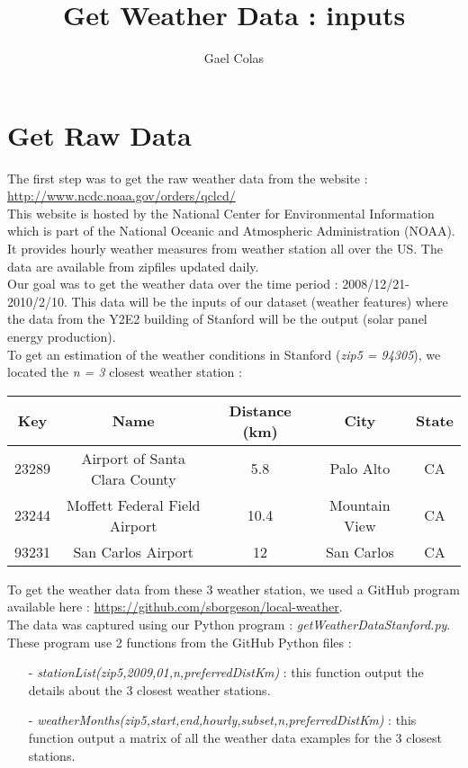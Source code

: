 \documentclass[]{report}
\title{Get Weather Data : inputs}
\author{Gael Colas}
\begin{document}
\section{Get Raw Data}

	The first step was to get the raw weather data from the website : \url{http://www.ncdc.noaa.gov/orders/qclcd/}\\
	
	This website is hosted by the National Center for Environmental Information which is part of the National Oceanic and Atmospheric Administration (NOAA). It provides hourly weather measures from weather station all over the US. The data are available from zipfiles updated daily.\\
	
	Our goal was to get the weather data over the time period : 2008/12/21-2010/2/10.
	This data will be the inputs of our dataset (weather features) where the data from the Y2E2 building of Stanford will be the output (solar panel energy production).\\
	
	To get an estimation of the weather conditions in Stanford (\emph{zip5 = 94305}), we located the \emph{n = 3} closest weather station :\\
	
	\begin{tabular}{|c|c|c|c|c|}
		\hline
		Key & Name & Distance (km) & City & State\\ \hline
		23289 & Airport of Santa Clara County & 5.8 & Palo Alto & CA\\ \hline
		23244 & Moffett Federal Field Airport & 10.4 & Mountain View & CA\\ \hline
		93231 & San Carlos Airport & 12 & San Carlos & CA\\ \hline
	\end{tabular}	
	\newline
	
	To get the weather data from these 3 weather station, we used a GitHub program available here : \url{https://github.com/sborgeson/local-weather}.\\
	
	The data was captured using our Python program : \emph{getWeatherDataStanford.py}. These program use 2 functions from the GitHub Python files :
	\begin{itemize}
		\item [-] \emph{stationList(zip5,2009,01,n,preferredDistKm)} : this function output the details about the 3 closest weather stations.
		\item [-] \emph{weatherMonths(zip5,start,end,hourly,subset,n,preferredDistKm)} : this function output a matrix of all the weather data examples for the 3 closest stations.\\
	\end{itemize}
	
\end{document}
